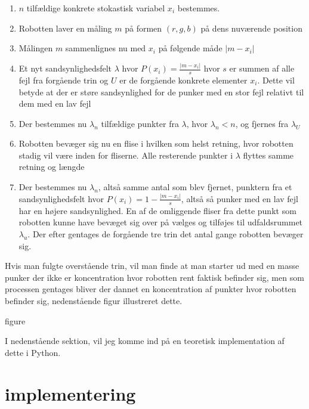 \documentclass[../../SRP.tex]{subfiles}
\begin{document}
\begin{enumerate}
  \item $n$ tilfældige konkrete stokastisk variabel $x_i$ bestemmes.

  \item Robotten laver en måling $m$ på formen $(r,g,b)$ på dens nuværende position

  \item Målingen $m$ sammenlignes nu med $x_i$ på følgende måde $|m - x_i|$

  \item Et nyt sandsynlighedsfelt $\lambda$ hvor $P(x_i) = \frac{|m - x_i|}{s}$ hvor $s$ er summen af alle fejl fra forgående trin og $U$ er de forgående konkrete elementer $x_i$. Dette vil betyde at der er støre sandsynlighed for de punker med en stor fejl relativt til dem med en lav fejl

  \item Der bestemmes nu $\lambda_n$ tilfældige punkter fra $\lambda$, hvor $ \lambda_n < n$, og fjernes fra $\lambda_U$

  \item Robotten bevæger sig nu en flise i hvilken som helst retning, hvor robotten stadig vil være inden for fliserne. Alle resterende punkter i $\lambda$ flyttes samme retning og længde 

  \item Der bestemmes nu $\lambda_n$, altså samme antal som blev fjernet, punktern fra et sandsynlighedsfelt hvor $P(x_i) = 1-\frac{|m-x_i|}{s}$, altså så punker med en lav fejl har en højere sandsynlighed. En af de omliggende fliser fra dette punkt som robotten kunne have bevæget sig over på vælges og tilføjes til udfaldsrummet $\lambda_u$. Der efter gentages de forgående tre trin det antal gange robotten bevæger sig.
\end{enumerate}
Hvis man fulgte overstående trin, vil man finde at man starter ud med en masse punker der ikke er koncentration hvor robotten rent faktisk befinder sig, men som processen gentages bliver der dannet en koncentration af punkter hvor robotten befinder sig, nedenstående figur illustreret dette.

{\Huge figure}

I nedenstående sektion, vil jeg komme ind på en teoretisk implementation af dette i Python.

\section{implementering}
\end{document}
